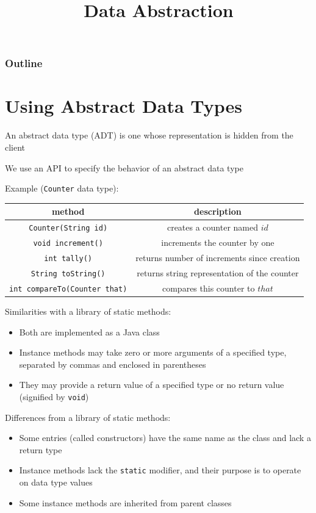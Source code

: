 \documentclass[8pt,a4paper,compress]{beamer}
\title{Data Abstraction}
\date{}
\begin{document}
\begin{frame}
\vfill
\titlepage
\end{frame}

\begin{frame}
\frametitle{Outline}
\tableofcontents
\end{frame}

\section{Using Abstract Data Types}
\begin{frame}[fragile]
An abstract data type (ADT) is one whose representation is hidden from the client

\bigskip

We use an API to specify the behavior of an abstract data type

\bigskip

Example (\lstinline{Counter} data type):
\begin{center}
\begin{tabular}{cc}
method & description \\ \hline
\lstinline$Counter(String id)$ & creates a counter named $id$ \\
\lstinline$void increment()$ & increments the counter by one \\
\lstinline$int tally()$ & returns number of increments since creation \\
\lstinline$String toString()$ & returns string representation of the counter \\
\lstinline$int compareTo(Counter that)$ & compares this counter to $that$
\end{tabular} 
\end{center}

\bigskip

Similarities with a library of static methods:
\begin{itemize}
\item Both are implemented as a Java class
\item Instance methods may take zero or more arguments of a specified type, separated by commas and enclosed in parentheses
\item They may provide a return value of a specified type or no return value (signified by \lstinline{void})
\end{itemize}

\bigskip

Differences from a library of static methods:
\begin{itemize}
\item Some entries (called constructors) have the same name as the class and lack a return type
\item Instance methods lack the \lstinline{static} modifier, and their purpose is to operate on data type values
\item Some instance methods are inherited from parent classes
\end{itemize}
\end{frame}
\end{document}

